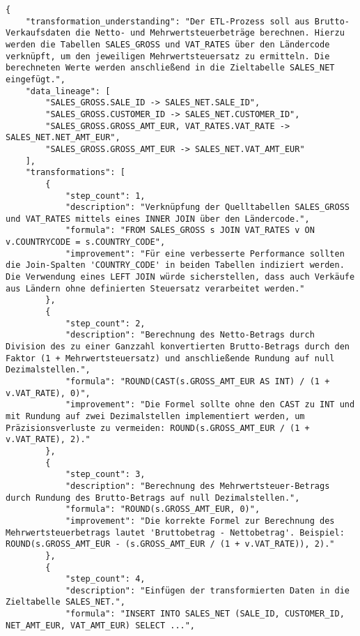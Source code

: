 \begin{lstlisting}[caption={Ausgabe: GEMINI 2.5 Pro Anwendungsfall 5 Robustheitsdurchlauf},label={gemini_case5_prompt3}]
{
    "transformation_understanding": "Der ETL-Prozess soll aus Brutto-Verkaufsdaten die Netto- und Mehrwertsteuerbeträge berechnen. Hierzu werden die Tabellen SALES_GROSS und VAT_RATES über den Ländercode verknüpft, um den jeweiligen Mehrwertsteuersatz zu ermitteln. Die berechneten Werte werden anschließend in die Zieltabelle SALES_NET eingefügt.",
    "data_lineage": [
        "SALES_GROSS.SALE_ID -> SALES_NET.SALE_ID",
        "SALES_GROSS.CUSTOMER_ID -> SALES_NET.CUSTOMER_ID",
        "SALES_GROSS.GROSS_AMT_EUR, VAT_RATES.VAT_RATE -> SALES_NET.NET_AMT_EUR",
        "SALES_GROSS.GROSS_AMT_EUR -> SALES_NET.VAT_AMT_EUR"
    ],
    "transformations": [
        {
            "step_count": 1,
            "description": "Verknüpfung der Quelltabellen SALES_GROSS und VAT_RATES mittels eines INNER JOIN über den Ländercode.",
            "formula": "FROM SALES_GROSS s JOIN VAT_RATES v ON v.COUNTRYCODE = s.COUNTRY_CODE",
            "improvement": "Für eine verbesserte Performance sollten die Join-Spalten 'COUNTRY_CODE' in beiden Tabellen indiziert werden. Die Verwendung eines LEFT JOIN würde sicherstellen, dass auch Verkäufe aus Ländern ohne definierten Steuersatz verarbeitet werden."
        },
        {
            "step_count": 2,
            "description": "Berechnung des Netto-Betrags durch Division des zu einer Ganzzahl konvertierten Brutto-Betrags durch den Faktor (1 + Mehrwertsteuersatz) und anschließende Rundung auf null Dezimalstellen.",
            "formula": "ROUND(CAST(s.GROSS_AMT_EUR AS INT) / (1 + v.VAT_RATE), 0)",
            "improvement": "Die Formel sollte ohne den CAST zu INT und mit Rundung auf zwei Dezimalstellen implementiert werden, um Präzisionsverluste zu vermeiden: ROUND(s.GROSS_AMT_EUR / (1 + v.VAT_RATE), 2)."
        },
        {
            "step_count": 3,
            "description": "Berechnung des Mehrwertsteuer-Betrags durch Rundung des Brutto-Betrags auf null Dezimalstellen.",
            "formula": "ROUND(s.GROSS_AMT_EUR, 0)",
            "improvement": "Die korrekte Formel zur Berechnung des Mehrwertsteuerbetrags lautet 'Bruttobetrag - Nettobetrag'. Beispiel: ROUND(s.GROSS_AMT_EUR - (s.GROSS_AMT_EUR / (1 + v.VAT_RATE)), 2)."
        },
        {
            "step_count": 4,
            "description": "Einfügen der transformierten Daten in die Zieltabelle SALES_NET.",
            "formula": "INSERT INTO SALES_NET (SALE_ID, CUSTOMER_ID, NET_AMT_EUR, VAT_AMT_EUR) SELECT ...",

\end{lstlisting}
